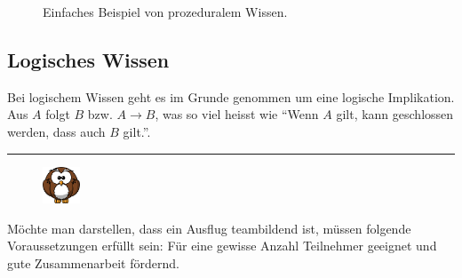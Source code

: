 \begin{figure}[htbp]
\centering {}
\caption{Einfaches Beispiel von prozeduralem Wissen.\label{fig:experten_systeme_prozedurales_wissen}\protect\footnotemark}
\end{figure}

\newpage

\subsection{Logisches Wissen}
\label{subsec:logisches_wissen}

Bei logischem Wissen geht es im Grunde genommen um eine logische Implikation. Aus $A$ folgt $B$ bzw. $A \to B$, was so viel heisst wie ``Wenn $A$ gilt, kann geschlossen werden, dass auch $B$ gilt.''.

\noindent\rule[1ex]{\textwidth}{1pt}
\begin{figure}
    \vspace{-14pt}
    \includegraphics[width=0.1\textwidth]{bilder/owl.png}
\end{figure}
Möchte man darstellen, dass ein Ausflug teambildend ist, müssen folgende Voraussetzungen erfüllt sein: Für eine gewisse Anzahl Teilnehmer geeignet und gute Zusammenarbeit fördernd.


